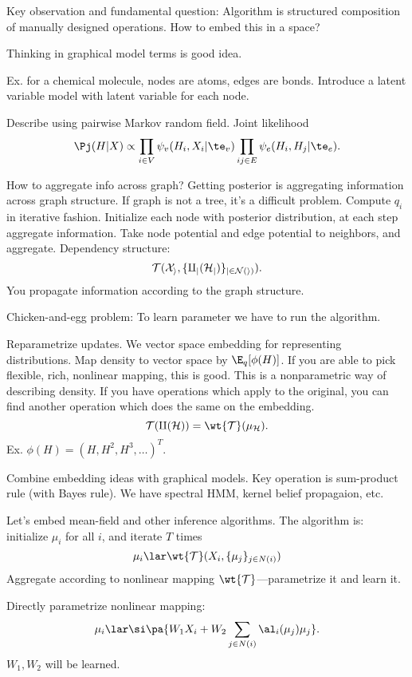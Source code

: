Key observation and fundamental question: 
Algorithm is structured composition of manually designed operations. How to embed this in a space?

Thinking in graphical model terms is good idea.

Ex. for a chemical molecule, nodes are atoms, edges are bonds. Introduce a latent variable model with latent variable for each node.

Describe using pairwise Markov random field.  Joint likelihood 
$$\Pj(H|X) \propto\prod_{i\in V} \psi_v(H_i, X_i|\te_v)\prod_{ij\in E}\psi_e(H_i,H_j|\te_e).$$

How to aggregate info across graph?
Getting posterior is aggregating information across graph structure.
If graph is not a tree, it's a difficult problem.  Compute $q_i$ in iterative fashion. Initialize each node with posterior distribution, at each step aggregate information. Take node potential and edge potential to neighbors, and aggregate.  Dependency structure:
$$
\cal T (X_i, \{q_j(H_j)\}_{j\in N(i)}).
$$
You propagate information according to the graph structure. 


Chicken-and-egg problem: To learn parameter we have to run the algorithm. 

Reparametrize updates. We vector space embedding for representing distributions. Map density to vector space by $\E_q[\phi(H)]$. If you are able to pick flexible, rich, nonlinear mapping, this is good. This is a nonparametric way of describing density. If you have operations which apply to the original, you can find another operation which does the same on the embedding.
$$
\cal T (q(H)) = \wt{\cal T}(\mu_H). 
$$
Ex. $\phi(H) = (H, H^2,H^3,\ldots)^T$. 


Combine embedding ideas with graphical models. Key operation is sum-product rule (with Bayes rule). We have spectral HMM, kernel belief propagaion, etc. 

Let's embed mean-field and other inference algorithms. The algorithm is: initialize $\mu_i$ for all $i$, and iterate $T$ times
$$
\mu_i \lar\wt{ \cal T} (X_i, \{\mu_j\}_{j\in N(i)})
$$
 Aggregate according to nonlinear mapping $\wt{\cal T}$---parametrize it and learn it.

Directly parametrize nonlinear mapping:
$$
\mu_i \lar \si\pa{
W_1 X_i + W_2\sum_{j\in N(i)} \al_i (\mu_j)\mu_j
}.
$$
$W_1,W_2$ will be learned. 

